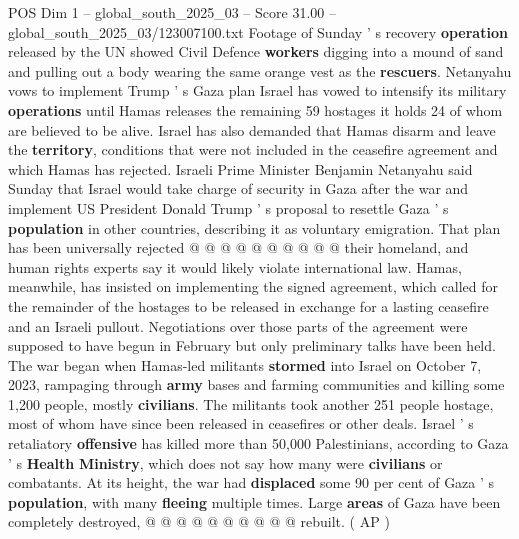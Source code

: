 \begin{textsample}{POS Dim 1 – global\_south\_2025\_03 – Score 31.00 – global\_south\_2025\_03/123007100.txt}
Footage of Sunday ' s recovery \textbf{operation} released by the UN showed Civil Defence \textbf{workers} digging into a mound of sand and pulling out a body wearing the same orange vest as the \textbf{rescuers}.
Netanyahu vows to implement Trump ' s Gaza plan Israel has vowed to intensify its military \textbf{operations} until Hamas releases the remaining 59 hostages it holds 24 of whom are believed to be alive.
Israel has also demanded that Hamas disarm and leave the \textbf{territory}, conditions that were not included in the ceasefire agreement and which Hamas has rejected.
Israeli Prime Minister Benjamin Netanyahu said Sunday that Israel would take charge of security in Gaza after the war and implement US President Donald Trump ' s proposal to resettle Gaza ' s \textbf{population} in other countries, describing it as voluntary emigration.
That plan has been universally rejected @ @ @ @ @ @ @ @ @ @ their homeland, and human rights experts say it would likely violate international law.
Hamas, meanwhile, has insisted on implementing the signed agreement, which called for the remainder of the hostages to be released in exchange for a lasting ceasefire and an Israeli pullout.
Negotiations over those parts of the agreement were supposed to have begun in February but only preliminary talks have been held.
The war began when Hamas-led militants \textbf{stormed} into Israel on October 7, 2023, rampaging through \textbf{army} bases and farming communities and killing some 1,200 people, mostly \textbf{civilians}.
The militants took another 251 people hostage, most of whom have since been released in ceasefires or other deals.
Israel ' s retaliatory \textbf{offensive} has killed more than 50,000 Palestinians, according to Gaza ' s \textbf{Health} \textbf{Ministry}, which does not say how many were \textbf{civilians} or combatants.
At its height, the war had \textbf{displaced} some 90 per cent of Gaza ' s \textbf{population}, with many \textbf{fleeing} multiple times.
Large \textbf{areas} of Gaza have been completely destroyed, @ @ @ @ @ @ @ @ @ @ rebuilt. ( AP )

\end{textsample}
